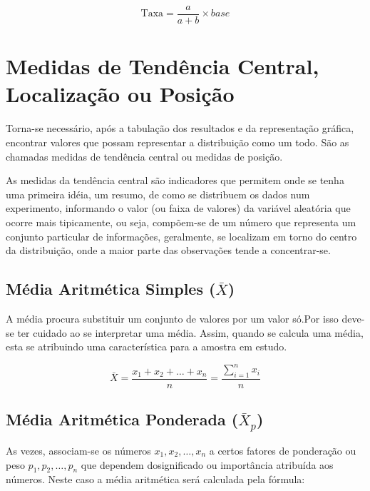 $$ \mbox{Taxa} = \frac{a}{a+b} \times base$$



\section{Medidas de Tendência Central, Localização ou Posição}

Torna-se necessário, após a tabulação dos resultados e da representação gráfica, encontrar valores que possam representar a distribuição como um todo. São as chamadas medidas de tendência central ou medidas de posição.\vskip0.3cm

As medidas da tendência central são indicadores que permitem onde se tenha uma primeira idéia, um resumo, de como se distribuem os dados num experimento, informando o valor (ou faixa de valores) da variável aleatória que ocorre mais tipicamente, ou seja, compõem-se de um número que representa um conjunto particular de informações, geralmente, se localizam em torno do centro da distribuição, onde a maior parte das observações tende a concentrar-se.





\subsection{Média Aritmética Simples ($\bar{X}$)}

A média procura substituir um conjunto de valores por um valor só.Por isso
deve-se ter cuidado ao se interpretar uma média. Assim, quando se calcula uma média, esta se atribuindo
uma característica para a amostra em estudo.



\begin{equation}\label{media1}
     \bar{X}=\frac{x_{1}+x_{2}+\ldots+x_{n}}{n}=\frac{\sum_{i=1}^{n}x_{i}}{n}
\end{equation}




\subsection{Média Aritmética Ponderada ($\bar{X}_{p}$)}

As vezes, associam-se os números $x_{1},x_{2},\ldots,x_{n}$ a certos fatores de ponderação ou peso $p_{1},p_{2},\ldots,p_{n}$ que dependem dosignificado ou importância atribuída aos números. Neste caso
 a média aritmética será calculada pela fórmula:

